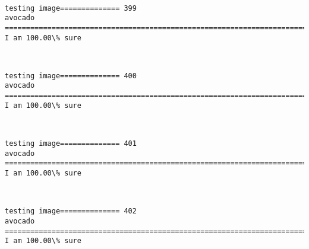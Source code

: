 \documentclass[11pt]{article}
\begin{document}
    \begin{center}
    \end{center}
    { \hspace*{\fill} \\}
    
    \begin{Verbatim}[commandchars=\\\{\}]
testing image============== 399
avocado
============================================================================
I am 100.00\% sure

    \end{Verbatim}

    \begin{center}
    \end{center}
    { \hspace*{\fill} \\}
    
    \begin{Verbatim}[commandchars=\\\{\}]
testing image============== 400
avocado
============================================================================
I am 100.00\% sure

    \end{Verbatim}

    \begin{center}
    \end{center}
    { \hspace*{\fill} \\}
    
    \begin{Verbatim}[commandchars=\\\{\}]
testing image============== 401
avocado
============================================================================
I am 100.00\% sure

    \end{Verbatim}

    \begin{center}
    \end{center}
    { \hspace*{\fill} \\}
    
    \begin{Verbatim}[commandchars=\\\{\}]
testing image============== 402
avocado
============================================================================
I am 100.00\% sure

    \end{Verbatim}
\end{document}
